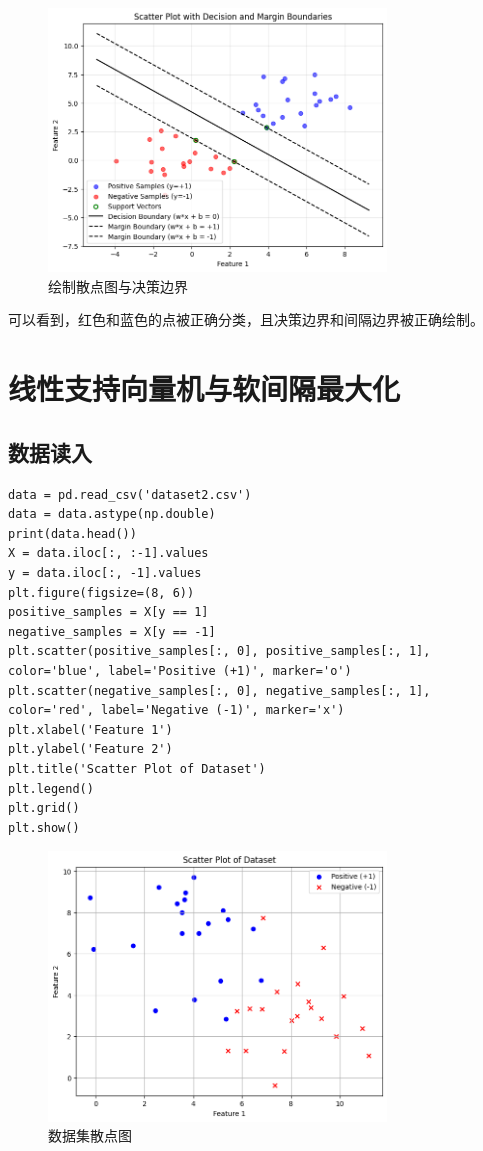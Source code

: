 \documentclass[12pt,a4paper,oneside]{article}
\begin{document}
\begin{figure}[H]
    \centering
    \includegraphics[width=0.8\textwidth]{image/4.png}
    \caption{绘制散点图与决策边界}
\end{figure}

可以看到，红色和蓝色的点被正确分类，且决策边界和间隔边界被正确绘制。
\section{线性支持向量机与软间隔最大化}
\subsection{数据读入}
\begin{lstlisting}
data = pd.read_csv('dataset2.csv')
data = data.astype(np.double)  
print(data.head())
X = data.iloc[:, :-1].values  
y = data.iloc[:, -1].values 
plt.figure(figsize=(8, 6))
positive_samples = X[y == 1]  
negative_samples = X[y == -1] 
plt.scatter(positive_samples[:, 0], positive_samples[:, 1], color='blue', label='Positive (+1)', marker='o')
plt.scatter(negative_samples[:, 0], negative_samples[:, 1], color='red', label='Negative (-1)', marker='x')
plt.xlabel('Feature 1')
plt.ylabel('Feature 2')
plt.title('Scatter Plot of Dataset')
plt.legend()
plt.grid()
plt.show()
\end{lstlisting}
\begin{figure}[H]
    \centering
    \includegraphics[width=0.8\textwidth]{image/5.png}
    \caption{数据集散点图}
\end{figure}
\end{document}
